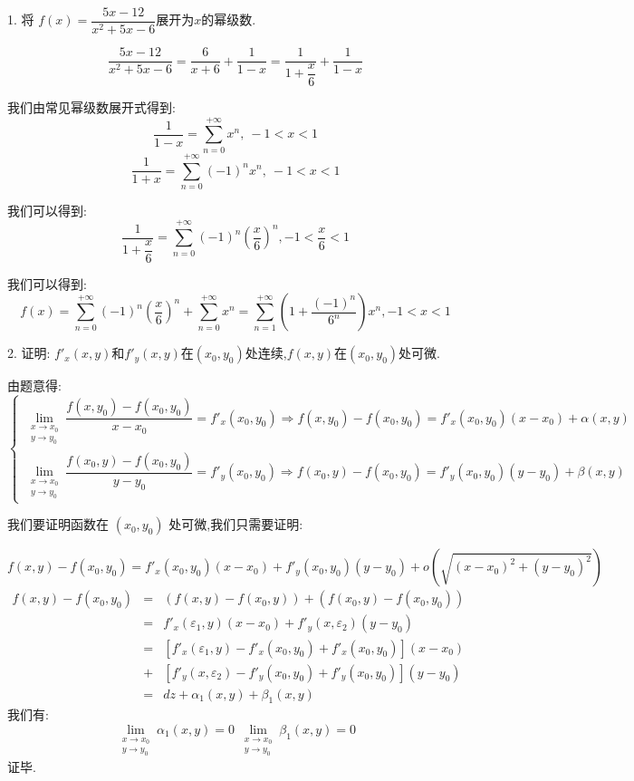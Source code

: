 1. 将 $f(x)=\dfrac{5x-12}{x^2+5x-6}$展开为$x$的幂级数.
\begin{solution}
	$$\frac{5x-12}{x^2+5x-6}=\frac{6}{x+6}+\frac{1}{1-x}=\dfrac{1}{1+\dfrac{x}{6}}+\frac{1}{1-x}$$
	
	我们由常见幂级数展开式得到: 
	$$\frac{1}{1-x}=\sum\limits_{n=0}^{+\infty}x^{n},\ -1<x<1$$
	$$\frac{1}{1+x}=\sum\limits_{n=0}^{+\infty}(-1)^{n}x^{n},\ -1<x<1$$
	
	我们可以得到: 
	$$\dfrac{1}{1+\dfrac{x}{6}}=\sum\limits_{n=0}^{+\infty}(-1)^{n}(\frac{x}{6})^{n},-1<\frac{x}{6}<1$$
	
	我们可以得到: 
	$$f(x)=\sum\limits_{n=0}^{+\infty}(-1)^{n}(\frac{x}{6})^{n}+\sum\limits_{n=0}^{+\infty}x^{n}=\sum\limits_{n=1}^{+\infty}(1+\frac{(-1)^n}{6^n})x^n,-1<x<1$$
	
\end{solution}

2. 证明: $f'_{x}(x,y)$和$f'_{y}(x,y)$在$(x_{0},y_{0})$处连续,$f(x,y)$在$(x_{0},y_{0})$处可微.
\begin{solution}
	
	由题意得: 
	$$\left\lbrace 
	\begin{array}{l}
		\lim\limits_{\substack{x\rightarrow x_{0}\\ y\rightarrow y_{0}}}\dfrac{f(x,y_{0})-f(x_{0},y_{0})}{x-x_{0}}=f'_{x}(x_{0},y_{0})\Rightarrow f(x,y_{0})-f(x_{0},y_{0})=f'_{x}(x_{0},y_{0})(x-x_{0})+\alpha(x,y)\\
		\lim\limits_{\substack{x\rightarrow x_{0}\\ y\rightarrow y_{0}}}\dfrac{f(x_{0},y)-f(x_{0},y_{0})}{y-y_{0}}=f'_{y}(x_{0},y_{0})\Rightarrow f(x_{0},y)-f(x_{0},y_{0})=f'_{y}(x_{0},y_{0})(y-y_{0})+\beta(x,y)
	\end{array}
	\right.$$
	
	我们要证明函数在 $(x_{0},y_{0})$ 处可微,我们只需要证明: 
	
	$$f(x,y)-f(x_{0},y_{0})=f'_{x}(x_{0},y_{0})(x-x_{0})+f'_{y}(x_{0},y_{0})(y-y_{0})+o(\sqrt{(x-x_{0})^2+(y-y_{0})^2})$$
	\begin{eqnarray*}
		f(x,y)-f(x_{0},y_{0})&=&(f(x,y)-f(x_{0},y))+(f(x_{0},y)-f(x_{0},y_{0}))\\
		&=&f'_{x}(\varepsilon_{1},y)(x-x_{0})+f'_{y}(x,\varepsilon_{2})(y-y_{0})\\
		&=&\left[f'_{x}(\varepsilon_{1},y)-f'_{x}(x_{0},y_{0})+f'_{x}(x_{0},y_{0}) \right](x-x_{0})\\ &+&\left[f'_{y}(x,\varepsilon_{2})-f'_{y}(x_{0},y_{0})+f'_{y}(x_{0},y_{0}) \right](y-y_{0})\\
		&=&dz+\alpha_{1}(x,y)+\beta_{1}(x,y)
	\end{eqnarray*}
	我们有: 
	$$\lim\limits_{\substack{x\rightarrow x_{0}\\ y\rightarrow y_{0}}}\alpha_{1}(x,y)=0\ \lim\limits_{\substack{x\rightarrow x_{0}\\ y\rightarrow y_{0}}}\beta_{1}(x,y)=0$$
	证毕.
\end{solution}


